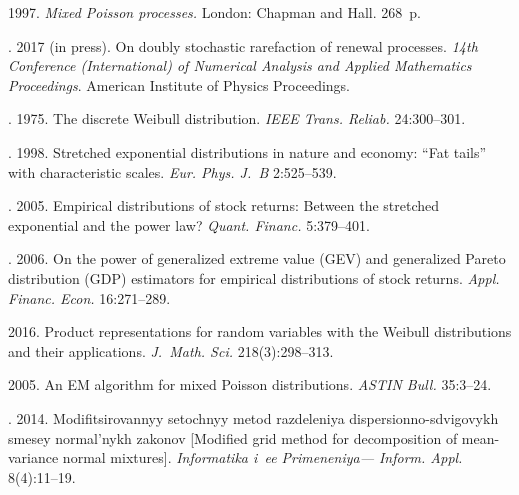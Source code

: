 \begin{multicols}{2}
{{\begin{thebibliography}{99}
 1997.
    \textit{Mixed Poisson processes.} London: Chapman and Hall. 268~p.
    
. 2017 (in press).
    On doubly stochastic rarefaction of renewal processes. \textit{14th 
     Conference (International) of Numerical Analysis and Applied
        Mathematics Proceedings}.
    American Institute of Physics Proceedings. 
    
    . 1975.
    The discrete Weibull distribution. \textit{IEEE Trans. Reliab.} 24:300--301.
    
    . 1998.
    Stretched exponential distributions in nature and economy: ``Fat
    tails'' with characteristic scales. \textit{Eur. Phys. J.~B} 2:525--539.
    
    . 2005.
    Empirical distributions of stock returns: Between the
    stretched exponential and the power law? \textit{Quant. Financ.} 5:379--401.
    
    . 2006.
    On the power of generalized extreme value (GEV) and
    generalized Pareto distribution (GDP) estimators for empirical
    distributions of stock returns. \textit{Appl. Financ. Econ.} 16:271--289.
    
     2016.
    Product representations for random variables with the Weibull distributions 
    and their applications. \textit{J.~Math. Sci.} 218(3):298--313.
    
     2005.
    An EM algorithm for mixed Poisson distributions. 
    \textit{ASTIN Bull.} 35:3--24.
    
    . 2014.
    Modi\-fi\-tsi\-ro\-van\-nyy setochnyy metod razdeleniya dispersionno-sdvigovykh smesey
    normal'nykh zakonov [Modified grid method for decomposition of 
    mean-variance normal mixtures].
    \textit{Informatika i~ee Primeneniya--- Inform. Appl.} 8(4):11--19.
    

\end{thebibliography}}}
\end{multicols}

